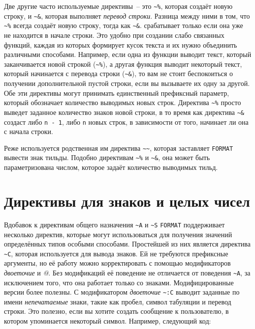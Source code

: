 Две другие часто используемые директивы~-- это \lstinline!~%!, которая создаёт новую
строку, и \lstinline!~&!, которая выполняет \textit{перевод строки}. Разница между ними в
том, что \lstinline!~%! всегда создаёт новую строку, тогда как \lstinline!~&!.
срабатывает только если она уже не находится в начале строки. Это удобно при создании
слабо связанных функций, каждая из которых формирует кусок текста и их нужно объединить
различными способами. Например, если одна из функции выводит текст, который заканчивается
новой строкой (\lstinline!~%!), а другая функция выводит некоторый текст, который
начинается с перевода строки (\lstinline!~&!), то вам не стоит беспокоиться о получении
дополнительной пустой строки, если вы вызываете их одну за другой. Обе эти директивы могут
принимать единственный префиксный параметр, который обозначает количество выводимых новых
строк. Директива \lstinline!~%! просто выведет заданное количество знаков новой строки, в
то время как директива \lstinline!~&! создаст либо \lstinline{n - 1}, либо \lstinline{n}
новых строк, в зависимости от того, начинает ли она с начала строки.

Реже используется родственная им директива \lstinline!~~!, которая заставляет
\lstinline{FORMAT} вывести знак тильды. Подобно директивам \lstinline!~%! и \lstinline!~&!,
она может быть параметризована числом, которое задаёт количество выводимых тильд.

\section{Директивы для знаков и целых чисел}
\label{ch18:chars-numbers}

Вдобавок к директивам общего назначения \lstinline!~A! и \lstinline!~S! \lstinline{FORMAT}
поддерживает несколько директив, которые могут использоваться для получения значений
определённых типов особыми способами. Простейшей из них является директива \lstinline!~C!,
которая используется для вывода знаков. Ей не требуются префиксные аргументы, но её работу
можно корректировать с помощью модификаторов \textit{двоеточие} и \textit{@}. Без
модификаций её поведение не отличается от поведения \lstinline!~A!, за исключением того,
что она работает только со знаками. Модифицированные версии более полезны. С модификатором
\textit{двоеточие} \lstinline!~:C! выводит заданные по имени \textit{непечатаемые} знаки,
такие как пробел, символ табуляции и перевод строки. Это полезно, если вы хотите создать
сообщение к пользователю, в котором упоминается некоторый символ. Например, следующий код:

